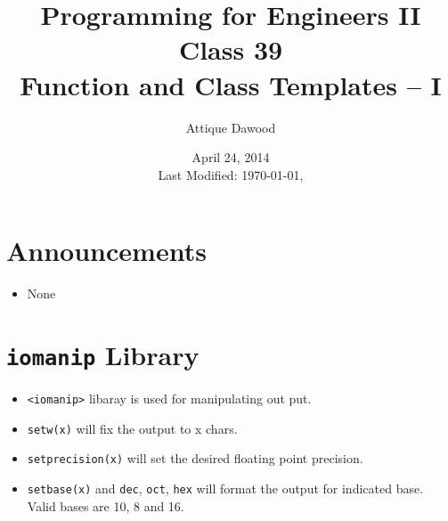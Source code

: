 \documentclass[12pt,a4paper]{article}
\title{\vspace{-2cm}Programming for Engineers II\\Class 39\\Function and Class Templates -- I}
\author{Attique Dawood}
\date{April 24, 2014\\[0.2cm] Last Modified: \today, \currenttime}
\begin{document}
\maketitle
\section{Announcements}
\begin{itemize}
\item None
\end{itemize}
\section{\texttt{iomanip} Library}
\begin{itemize}
\item \verb|<iomanip>| libaray is used for manipulating out put.
\item \verb|setw(x)| will fix the output to x chars.
\item \verb|setprecision(x)| will set the desired floating point precision.
\item \verb|setbase(x)| and \verb|dec|, \verb|oct|, \verb|hex| will format the output for indicated base. Valid bases are 10, 8 and 16.
\end{itemize}
\end{document}
